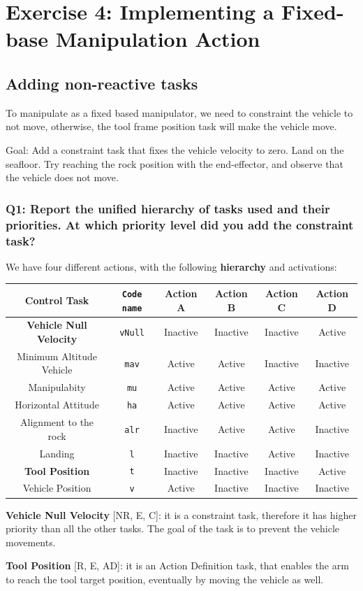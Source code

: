 \documentclass{article}
\begin{document}
\clearpage
\section{Exercise 4: Implementing a Fixed-base Manipulation Action}
\subsection{Adding non-reactive tasks} \label{subsec:non-react}
To manipulate as a fixed based manipulator, we need to constraint the vehicle to not move, otherwise, the tool frame position task will make the vehicle move.

Goal: Add a constraint task that fixes the vehicle velocity to zero. Land on the seafloor. Try reaching the rock position with the end-effector, and observe that the vehicle does not move.

\subsubsection{Q1: Report the unified hierarchy of tasks used and their priorities. At which priority level did you add the constraint task?}
We have four different actions, with the following \textbf{hierarchy} and activations:
\begin{center}
\begin{tabular}{ | c | c | c | c | c | c |}
\hline
 Control Task & \texttt{Code name} & Action A & Action B & Action C & Action D\\
 \hline
 \textbf{Vehicle Null Velocity} & \texttt{vNull} & Inactive & Inactive & Inactive & Active\\
 Minimum Altitude Vehicle &  \texttt{mav} & Active & Active & Inactive & Inactive \\  
 Manipulabity &  \texttt{mu} & Active & Active & Active & Active  \\
 Horizontal Attitude &  \texttt{ha} & Active & Active & Active & Active\\
 Alignment to the rock & \texttt{alr} & Inactive & Active & Active & Inactive \\
 Landing & \texttt{l} &Inactive & Inactive & Active & Inactive\\
 \textbf{Tool Position}  &  \texttt{t} & Inactive & Inactive & Inactive & Active\\
 Vehicle Position &  \texttt{v} &Active & Inactive & Inactive & Inactive\\
 \hline
\end{tabular}
\end{center}
\begin{description}
\item \textbf{Vehicle Null Velocity} [NR, E, C]: it is a constraint task, therefore it has higher priority than all the other tasks. The goal of the task is to prevent the vehicle movements.
\item \textbf{Tool Position} [R, E, AD]: it is an Action Definition task, that enables the arm to reach the tool target position, eventually by moving the vehicle as well. 
\end{description}
\end{document}
